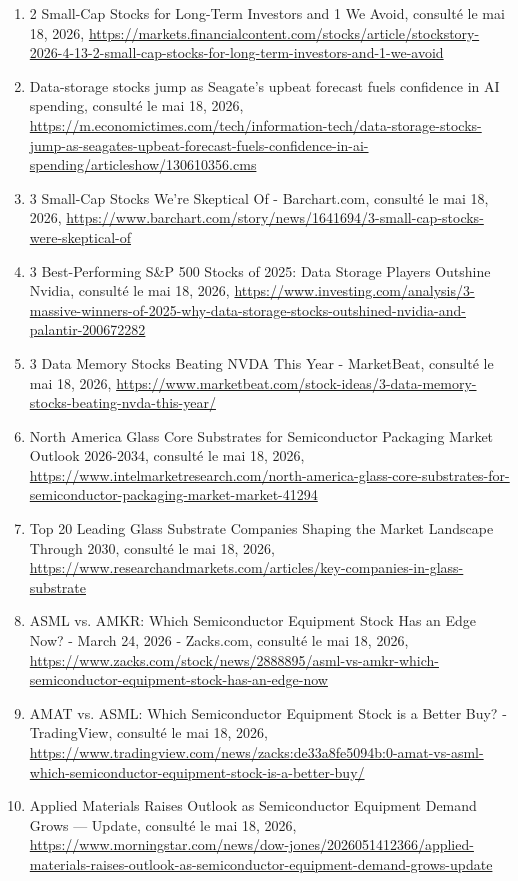\documentclass[11pt,a4paper]{article}
\begin{document}
\begin{enumerate}
    \item 2 Small-Cap Stocks for Long-Term Investors and 1 We Avoid, consulté le mai 18, 2026, \url{https://markets.financialcontent.com/stocks/article/stockstory-2026-4-13-2-small-cap-stocks-for-long-term-investors-and-1-we-avoid}
    \item Data-storage stocks jump as Seagate's upbeat forecast fuels confidence in AI spending, consulté le mai 18, 2026, \url{https://m.economictimes.com/tech/information-tech/data-storage-stocks-jump-as-seagates-upbeat-forecast-fuels-confidence-in-ai-spending/articleshow/130610356.cms}
    \item 3 Small-Cap Stocks We're Skeptical Of - Barchart.com, consulté le mai 18, 2026, \url{https://www.barchart.com/story/news/1641694/3-small-cap-stocks-were-skeptical-of}
    \item 3 Best-Performing S\&P 500 Stocks of 2025: Data Storage Players Outshine Nvidia, consulté le mai 18, 2026, \url{https://www.investing.com/analysis/3-massive-winners-of-2025-why-data-storage-stocks-outshined-nvidia-and-palantir-200672282}
    \item 3 Data Memory Stocks Beating NVDA This Year - MarketBeat, consulté le mai 18, 2026, \url{https://www.marketbeat.com/stock-ideas/3-data-memory-stocks-beating-nvda-this-year/}
    \item North America Glass Core Substrates for Semiconductor Packaging Market Outlook 2026-2034, consulté le mai 18, 2026, \url{https://www.intelmarketresearch.com/north-america-glass-core-substrates-for-semiconductor-packaging-market-market-41294}
    \item Top 20 Leading Glass Substrate Companies Shaping the Market Landscape Through 2030, consulté le mai 18, 2026, \url{https://www.researchandmarkets.com/articles/key-companies-in-glass-substrate}
    \item ASML vs. AMKR: Which Semiconductor Equipment Stock Has an Edge Now? - March 24, 2026 - Zacks.com, consulté le mai 18, 2026, \url{https://www.zacks.com/stock/news/2888895/asml-vs-amkr-which-semiconductor-equipment-stock-has-an-edge-now}
    \item AMAT vs. ASML: Which Semiconductor Equipment Stock is a Better Buy? - TradingView, consulté le mai 18, 2026, \url{https://www.tradingview.com/news/zacks:de33a8fe5094b:0-amat-vs-asml-which-semiconductor-equipment-stock-is-a-better-buy/}
    \item Applied Materials Raises Outlook as Semiconductor Equipment Demand Grows — Update, consulté le mai 18, 2026, \url{https://www.morningstar.com/news/dow-jones/2026051412366/applied-materials-raises-outlook-as-semiconductor-equipment-demand-grows-update}

\end{enumerate}
\end{document}

